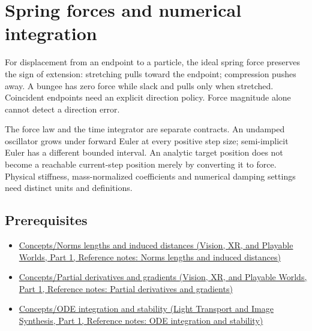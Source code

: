 \hypertarget{appendix-e040e2108923}{}\label{referencestart:appendix-e040e2108923}
\section{Spring forces and numerical integration}\label{appendix-e040e2108923-spring-forces-and-numerical-integration}

\hypertarget{appendix-e040e2108923-spring-forces-and-numerical-integration}{}

For displacement from an endpoint to a particle, the ideal spring force preserves the sign of extension: stretching pulls toward the endpoint; compression pushes away. A bungee has zero force while slack and pulls only when stretched. Coincident endpoints need an explicit direction policy. Force magnitude alone cannot detect a direction error.

The force law and the time integrator are separate contracts. An undamped oscillator grows under forward Euler at every positive step size; semi-implicit Euler has a different bounded interval. An analytic target position does not become a reachable current-step position merely by converting it to force. Physical stiffness, mass-normalized coefficients and numerical damping settings need distinct units and definitions.

\subsection{Prerequisites}\label{appendix-e040e2108923-prerequisites}

\hypertarget{appendix-e040e2108923-prerequisites}{}

\begin{itemize}
\tightlist
\item
  \href{../07-Vision-XR-and-Playable-Worlds-P01/main.pdf\#appendix-49933872bb51}{Concepts/Norms lengths and induced distances (Vision, XR, and Playable Worlds, Part 1, Reference notes: Norms lengths and induced distances)}
\item
  \href{../07-Vision-XR-and-Playable-Worlds-P01/main.pdf\#appendix-677b59746ae0}{Concepts/Partial derivatives and gradients (Vision, XR, and Playable Worlds, Part 1, Reference notes: Partial derivatives and gradients)}
\item
  \href{../04-Light-Transport-and-Image-Synthesis-P01/main.pdf\#appendix-18eacf61a04b}{Concepts/ODE integration and stability (Light Transport and Image Synthesis, Part 1, Reference notes: ODE integration and stability)}
\end{itemize}

